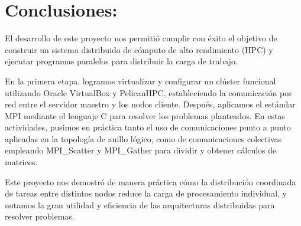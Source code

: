 \documentclass[letterpaper,11pt]{article}
\begin{document}
    \newpage
    \section{Conclusiones:}
    El desarrollo de este proyecto nos permitió cumplir con éxito el objetivo de construir un sistema distribuido de cómputo de alto rendimiento (HPC) y ejecutar programas paralelos para distribuir la carga de trabajo.

    En la primera etapa, logramos virtualizar y configurar un clúster funcional utilizando Oracle VirtualBox y PelicanHPC, estableciendo la comunicación por red entre el servidor maestro y los nodos cliente. Después, aplicamos el estándar MPI mediante el lenguaje C para resolver los problemas planteados. En estas actividades, pusimos en práctica tanto el uso de comunicaciones punto a punto aplicadas en la topología de anillo lógico, como de comunicaciones colectivas empleando MPI\_Scatter y MPI\_Gather para dividir y obtener cálculos de matrices.

    Este proyecto nos demostró de manera práctica cómo la distribución coordinada de tareas entre distintos nodos reduce la carga de procesamiento individual, y notamos la gran utilidad y eficiencia de las arquitecturas distribuidas para resolver problemas.

    \nocite{*}
    \printbibliography[heading=bibintoc, title={Referencias}]
\end{document}
